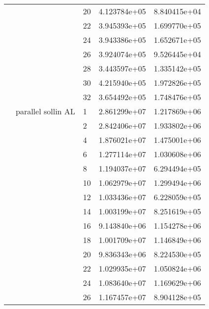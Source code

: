 \begin{tabular}{lllrr}
                      &                     & 20 &  4.123784e+05 &  8.840415e+04 \\
                      &                     & 22 &  3.945393e+05 &  1.699770e+05 \\
                      &                     & 24 &  3.943386e+05 &  1.652671e+05 \\
                      &                     & 26 &  3.924074e+05 &  9.526445e+04 \\
                      &                     & 28 &  3.443597e+05 &  1.335142e+05 \\
                      &                     & 30 &  4.215940e+05 &  1.972826e+05 \\
                      &                     & 32 &  3.654492e+05 &  1.748476e+05 \\
                      & parallel sollin AL & 1  &  2.861299e+07 &  1.217869e+06 \\
                      &                     & 2  &  2.842406e+07 &  1.933802e+06 \\
                      &                     & 4  &  1.876021e+07 &  1.475001e+06 \\
                      &                     & 6  &  1.277114e+07 &  1.030608e+06 \\
                      &                     & 8  &  1.194037e+07 &  6.294494e+05 \\
                      &                     & 10 &  1.062979e+07 &  1.299494e+06 \\
                      &                     & 12 &  1.033436e+07 &  6.228059e+05 \\
                      &                     & 14 &  1.003199e+07 &  8.251619e+05 \\
                      &                     & 16 &  9.143840e+06 &  1.154278e+06 \\
                      &                     & 18 &  1.001709e+07 &  1.146849e+06 \\
                      &                     & 20 &  9.836343e+06 &  8.224530e+05 \\
                      &                     & 22 &  1.029935e+07 &  1.050824e+06 \\
                      &                     & 24 &  1.083640e+07 &  1.169629e+06 \\
                      &                     & 26 &  1.167457e+07 &  8.904128e+05 \\

\end{tabular}
